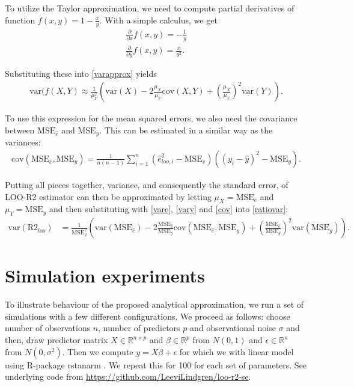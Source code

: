 \documentclass{article}
\begin{document}
To utilize the Taylor approximation, we need to compute partial derivatives of function $f(x,y) = 1 - \frac{x}{y}$. With a simple calculus, we get
\begin{align}
    \frac{\partial}{\partial x}f(x,y) = -\frac{1}{y} \\
    \frac{\partial}{\partial y}f(x,y) = \frac{x}{y^2}.
\end{align}

Substituting these into \eqref{varapprox} yields
\begin{align}
    \text{var}(f(X, Y) \approx \frac{1}{\mu_Y^2} \left( \text{var}(X) - 2 \frac{\mu_X}{\mu_Y} \text{cov}(X,Y) + \left( \frac{\mu_X}{\mu_Y} \right)^2 \text{var}(Y) \right) \label{ratiovar}.
\end{align}

 To use this expression for the mean squared errors, we also need the covariance between $\text{MSE}_{\hat{e}}$ and $\text{MSE}_y$. This can be estimated in a similar way as the variances:
 \begin{align}
     \text{cov}(\text{MSE}_{\hat{e}}, \text{MSE}_{y} ) = \frac{1}{n (n -1 )} \sum_{i = 1}^n \left( \hat{e}_{loo, i}^2 - \text{MSE}_{\hat{e}} \right) \left( (y_i - \hat{y})^2 -\text{MSE}_y \right) \label{cov}.
 \end{align}
 
 Putting all pieces together, variance, and consequently the standard error, of LOO-R2 estimator can then be approximated by letting $\mu_X = \text{MSE}_{\hat{e}}$ and $\mu_Y = \text{MSE}_y$ and then substituting with \eqref{vare}, \eqref{vary} and \eqref{cov} into \eqref{ratiovar}:
 \begin{align}
     \text{var}(\text{R2}_{loo}) &= \frac{1}{\text{MSE}_y^2} \left( \text{var}(\text{MSE}_{\hat{e}}) - 2 \frac{\text{MSE}_{\hat{e}}}{\text{MSE}_y} \text{cov}(\text{MSE}_{\hat{e}}, \text{MSE}_{y} ) +  \left( \frac{\text{MSE}_{\hat{e}}}{\text{MSE}_y} \right)^2 \text{var}(\text{MSE}_y) \right) \label{estimator}.
 \end{align}
 
\section{Simulation experiments}
To illustrate behaviour of the proposed analytical approximation, we run a set of simulations with a few different configurations. We proceed as follows: choose number of observations $n$, number of predictors $p$ and observational noise $\sigma$ and then, draw predictor matrix $X \in \mathbb{R}^{n \times p}$ and $\beta \in \mathbb{R}^{p}$ from $N(0, 1)$ and  $\epsilon \in \mathbb{R}^{n}$ from $N(0, \sigma^2)$. Then we compute $y = X \beta + \epsilon$ for which we with linear model using R-package rstanarm \citep{rstanarm}. We repeat this for 100 for each set of parameters. See underlying code from \url{https://github.com/LeeviLindgren/loo-r2-se}.
\end{document}
